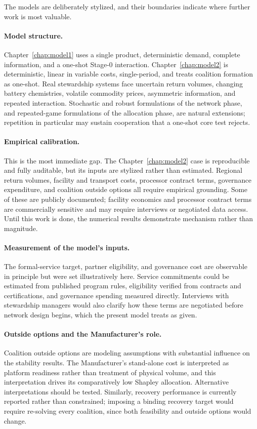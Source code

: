 The models are deliberately stylized, and their boundaries indicate where further work is most valuable.

\paragraph{Model structure.} Chapter~\ref{chap:model1} uses a single product, deterministic demand, complete information, and a one-shot Stage-0 interaction. Chapter~\ref{chap:model2} is deterministic, linear in variable costs, single-period, and treats coalition formation as one-shot. Real stewardship systems face uncertain return volumes, changing battery chemistries, volatile commodity prices, asymmetric information, and repeated interaction. Stochastic and robust formulations of the network phase, and repeated-game formulations of the allocation phase, are natural extensions; repetition in particular may sustain cooperation that a one-shot core test rejects.

\paragraph{Empirical calibration.} This is the most immediate gap. The Chapter~\ref{chap:model2} case is reproducible and fully auditable, but its inputs are stylized rather than estimated. Regional return volumes, facility and transport costs, processor contract terms, governance expenditure, and coalition outside options all require empirical grounding. Some of these are publicly documented; facility economics and processor contract terms are commercially sensitive and may require interviews or negotiated data access. Until this work is done, the numerical results demonstrate mechanism rather than magnitude.

\paragraph{Measurement of the model's inputs.} The formal-service target, partner eligibility, and governance cost are observable in principle but were set illustratively here. Service commitments could be estimated from published program rules, eligibility verified from contracts and certifications, and governance spending measured directly. Interviews with stewardship managers would also clarify how these terms are negotiated before network design begins, which the present model treats as given.

\paragraph{Outside options and the Manufacturer's role.} Coalition outside options are modeling assumptions with substantial influence on the stability results. The Manufacturer's stand-alone cost is interpreted as platform readiness rather than treatment of physical volume, and this interpretation drives its comparatively low Shapley allocation. Alternative interpretations should be tested. Similarly, recovery performance is currently reported rather than constrained; imposing a binding recovery target would require re-solving every coalition, since both feasibility and outside options would change.

